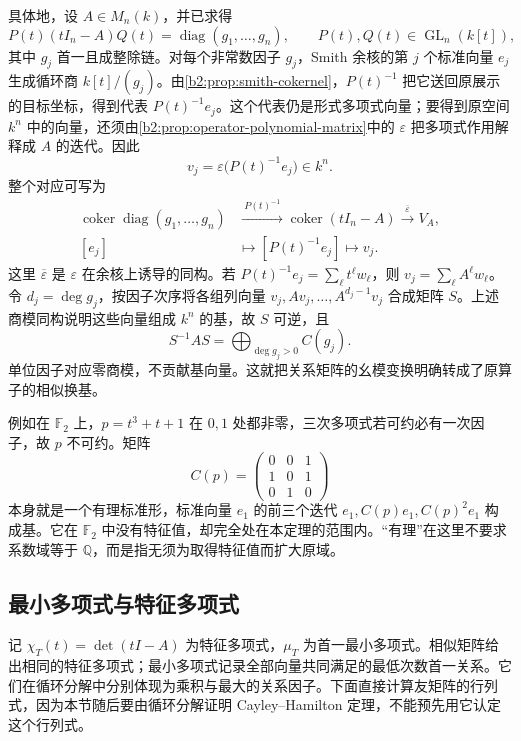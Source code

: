 具体地，设 \(A\in M_n(k)\)，并已求得
\[
	P(t)(tI_n-A)Q(t)=\operatorname{diag}(g_1,\ldots,g_n), \qquad P(t),Q(t)\in\operatorname{GL}_n(k[t]),
\]
其中 \(g_j\) 首一且成整除链。对每个非常数因子 \(g_j\)，Smith 余核的第 \(j\) 个标准向量 \(e_j\) 生成循环商 \(k[t]/(g_j)\)。由\cref{b2:prop:smith-cokernel}，\(P(t)^{-1}\) 把它送回原展示的目标坐标，得到代表 \(P(t)^{-1}e_j\)。这个代表仍是形式多项式向量；要得到原空间 \(k^n\) 中的向量，还须由\cref{b2:prop:operator-polynomial-matrix}中的 \(\varepsilon\) 把多项式作用解释成 \(A\) 的迭代。因此
\[
	v_j=\varepsilon\bigl(P(t)^{-1}e_j\bigr)\in k^n.
\]
整个对应可写为
\[
	\begin{aligned}
		\operatorname{coker}\operatorname{diag}(g_1,\ldots,g_n) &\xrightarrow{\ P(t)^{-1}\ }\operatorname{coker}(tI_n-A) \xrightarrow{\ \overline\varepsilon\ }V_A,\\
		[e_j]&\longmapsto[P(t)^{-1}e_j]\longmapsto v_j.
	\end{aligned}
\]
这里 \(\overline\varepsilon\) 是 \(\varepsilon\) 在余核上诱导的同构。若 \(P(t)^{-1}e_j=\sum_\ell t^\ell w_\ell\)，则 \(v_j=\sum_\ell A^\ell w_\ell\)。令 \(d_j=\deg g_j\)，按因子次序将各组列向量 \(v_j,Av_j,\ldots,A^{d_j-1}v_j\) 合成矩阵 \(S\)。上述商模同构说明这些向量组成 \(k^n\) 的基，故 \(S\) 可逆，且
\[
	S^{-1}AS=\bigoplus_{\deg g_j>0}C(g_j).
\]
单位因子对应零商模，不贡献基向量。这就把关系矩阵的幺模变换明确转成了原算子的相似换基。

\ProseParagraphBreak
例如在 \(\mathbb F_2\) 上，\(p=t^3+t+1\) 在 \(0,1\) 处都非零，三次多项式若可约必有一次因子，故 \(p\) 不可约。矩阵
\[
	C(p)=\begin{pmatrix}0&0&1\\1&0&1\\0&1&0\end{pmatrix}
\]
本身就是一个有理标准形，标准向量 \(e_1\) 的前三个迭代 \(e_1,C(p)e_1,C(p)^2e_1\) 构成基。它在 \(\mathbb F_2\) 中没有特征值，却完全处在本定理的范围内。“有理”在这里不要求系数域等于 \(\mathbb Q\)，而是指无须为取得特征值而扩大原域。

\subsection{最小多项式与特征多项式}
\label{b2:subsec:0404:03}

记 \(\chi_T(t)=\det(tI-A)\) 为特征多项式，\(\mu_T\) 为首一最小多项式。相似矩阵给出相同的特征多项式；最小多项式记录全部向量共同满足的最低次数首一关系。它们在循环分解中分别体现为乘积与最大的关系因子。下面直接计算友矩阵的行列式，因为本节随后要由循环分解证明 Cayley--Hamilton 定理，不能预先用它认定这个行列式。


